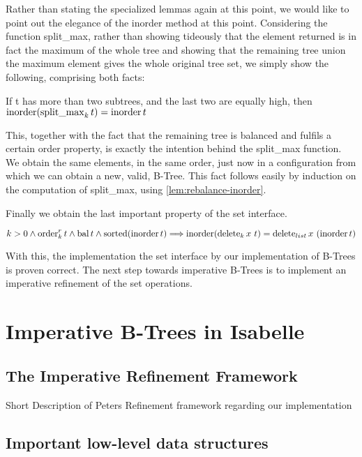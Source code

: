 Rather than stating the specialized lemmas again at this point, we would like to point
out the elegance of the inorder method at this point.
Considering the function split\_max, rather than showing
tideously that the element returned is in fact the maximum of the whole tree
and showing that the remaining tree union the maximum element
gives the whole original tree set, we simply show the following,
comprising both facts:

\begin{lemma}
    \label{lem:splitmax-inorder}
    If t has more than two subtrees, and the last two are equally high, then
    $\operatorname{inorder} (\operatorname{split\_max}_k t) = \operatorname{inorder} t$
\end{lemma}

This, together with the fact that the remaining tree is balanced and
fulfils a certain order property, is exactly
the intention behind the split\_max function.
We obtain the same elements, in the same order,
just now in a configuration from which we can obtain
a new, valid, B-Tree.
This fact follows easily by induction on the computation of split\_max,
using \autoref{lem:rebalance-inorder}.

Finally we obtain the last important property of the set interface.
\begin{theorem}
    $k > 0 \wedge \operatorname{order}^r_k t \wedge \operatorname{bal} t \wedge \operatorname{sorted}  (\operatorname{inorder} t)\Longrightarrow
    \operatorname{inorder} (\operatorname{delete}_k x\ t) = \operatorname{delete}_{list} x\ (\operatorname{inorder} t)$
\end{theorem}

With this, the implementation the set interface by
our implementation of B-Trees is proven correct.
The next step towards imperative B-Trees is to implement
an imperative refinement of the set operations.

\chapter{Imperative B-Trees in Isabelle}

\section{The Imperative Refinement Framework}

Short Description of Peters Refinement framework regarding our implementation

\section{Important low-level data structures}

